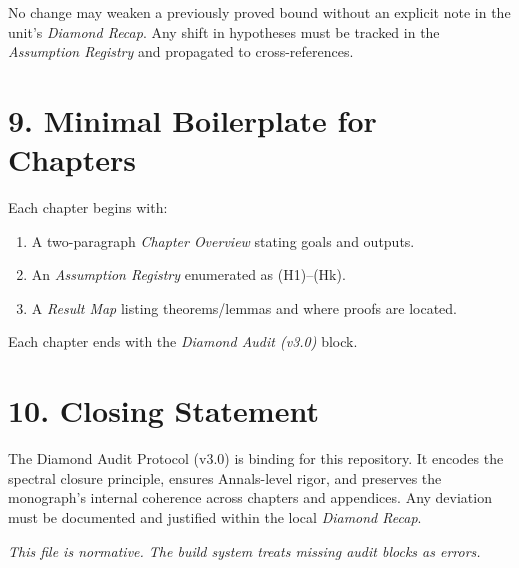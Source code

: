 No change may weaken a previously proved bound without an explicit note in the unit’s \emph{Diamond Recap}. Any shift in hypotheses must be tracked in the \emph{Assumption Registry} and propagated to cross-references.

\section*{9. Minimal Boilerplate for Chapters}

Each chapter begins with:
\begin{enumerate}[label=\textbf{B\arabic*}.]
  \item A two-paragraph \emph{Chapter Overview} stating goals and outputs.
  \item An \emph{Assumption Registry} enumerated as (H1)–(Hk).
  \item A \emph{Result Map} listing theorems/lemmas and where proofs are located.
\end{enumerate}
Each chapter ends with the \emph{Diamond Audit (v3.0)} block.

\section*{10. Closing Statement}

The Diamond Audit Protocol (v3.0) is binding for this repository. It encodes the spectral closure principle, ensures Annals-level rigor, and preserves the monograph’s internal coherence across chapters and appendices. Any deviation must be documented and justified within the local \emph{Diamond Recap}.

\bigskip
\noindent
\emph{This file is normative. The build system treats missing audit blocks as errors.}

